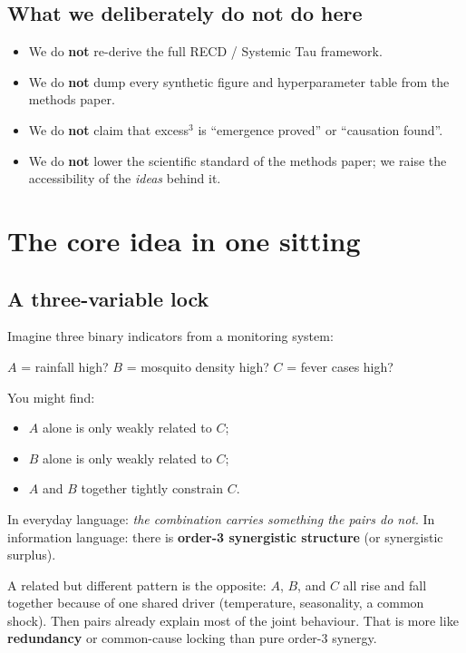 \documentclass[11pt,a4paper]{article}
\begin{document}
\subsection{What we deliberately do not do here}

\begin{itemize}[leftmargin=*,itemsep=2pt]
  \item We do \textbf{not} re-derive the full RECD / Systemic Tau framework.
  \item We do \textbf{not} dump every synthetic figure and hyperparameter
  table from the methods paper.
  \item We do \textbf{not} claim that excess$^3$ is ``emergence proved'' or
  ``causation found''.
  \item We do \textbf{not} lower the scientific standard of the methods
  paper; we raise the accessibility of the \emph{ideas} behind it.
\end{itemize}

\section{The core idea in one sitting}
\label{sec:core}

\subsection{A three-variable lock}

Imagine three binary indicators from a monitoring system:
\begin{center}
$A$ = rainfall high? \quad
$B$ = mosquito density high? \quad
$C$ = fever cases high?
\end{center}
You might find:
\begin{itemize}[leftmargin=*,itemsep=2pt]
  \item $A$ alone is only weakly related to $C$;
  \item $B$ alone is only weakly related to $C$;
  \item $A$ and $B$ together tightly constrain $C$.
\end{itemize}
In everyday language: \emph{the combination carries something the pairs do
not}. In information language: there is \textbf{order-3 synergistic
structure} (or synergistic surplus).

A related but different pattern is the opposite: $A$, $B$, and $C$ all rise
and fall together because of one shared driver (temperature, seasonality, a
common shock). Then pairs already explain most of the joint behaviour. That
is more like \textbf{redundancy} or common-cause locking than pure
order-3 synergy.
\end{document}
